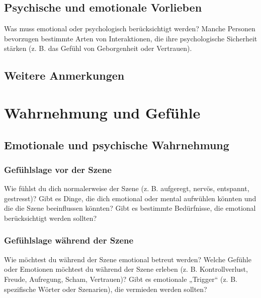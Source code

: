 \documentclass[a4paper,12pt]{article}
\begin{document}
\newpage
\subsection{Psychische und emotionale Vorlieben}
\noindent Was muss emotional oder psychologisch berücksichtigt werden? Manche Personen bevorzugen bestimmte Arten von Interaktionen, die ihre psychologische Sicherheit stärken (z. B. das Gefühl von Geborgenheit oder Vertrauen).\newline
\noindent \TextField[name=WuenschePsych,multiline=true,height=20em, width=37em]{}
    
\subsection{Weitere Anmerkungen}
\noindent \TextField[name=WuenscheWeiteres,multiline=true,height=20em, width=37em]{}


\newpage
\section{Wahrnehmung und Gefühle}
\subsection{Emotionale und psychische Wahrnehmung}
\subsubsection{Gefühlslage vor der Szene}
\noindent Wie fühlst du dich normalerweise der Szene (z. B. aufgeregt, nervös, entspannt, gestresst)? Gibt es Dinge, die dich emotional oder mental aufwühlen könnten und die die Szene beeinflussen könnten? Gibt es bestimmte Bedürfnisse, die emotional berücksichtigt werden sollten? \newline
\noindent \TextField[name=WahrVor,multiline=true,height=10em, width=37em]{}

\subsubsection{Gefühlslage während der Szene}
\noindent Wie möchtest du während der Szene emotional betreut werden? Welche Gefühle oder Emotionen möchtest du während der Szene erleben (z. B. Kontrollverlust, Freude, Aufregung, Scham, Vertrauen)? Gibt es emotionale „Trigger“ (z. B. spezifische Wörter oder Szenarien), die vermieden werden sollten?\newline
\noindent \TextField[name=WahrWae,multiline=true,height=10em, width=37em]{}
\end{document}
